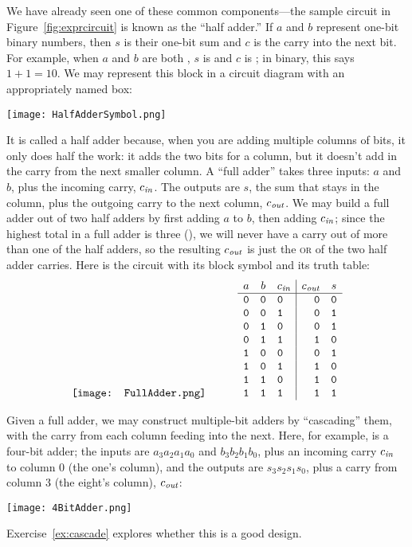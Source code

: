 We have already seen one of these common components---the sample circuit in Figure~\ref{fig:exprcircuit} is known as the ``half adder.'' If $a$ and $b$ represent one-bit binary numbers, then $s$ is their one-bit sum and $c$ is the carry into the next bit. For example, when $a$ and $b$ are both \1, $s$ is \0 and $c$ is \1; in binary, this says $1+1=10$. We may represent this block in a circuit diagram with an appropriately named box:
\begin{center}
\texttt{[image: HalfAdderSymbol.png]}
\end{center}
It is called a half adder because, when you are adding multiple columns of bits, it only does half the work: it adds the two bits for a column, but it doesn't add in the carry from the next smaller column. A ``full adder'' takes three inputs: $a$ and $b$, plus the incoming carry, $c_\textit{\scriptsize in}$. The outputs are $s$, the sum that stays in the column, plus the outgoing carry to the next column, $c_\textit{\scriptsize out}$. We may build a full adder out of two half adders by first adding $a$ to $b$, then adding $c_\textit{\scriptsize in}$; since the highest total in a full adder is three (\1\1), we will never have a carry out of more than one of the half adders, so the resulting $c_\textit{\scriptsize out}$ is just the \textsc{or} of the two half adder carries. Here is the circuit with its block symbol and its truth table:
\[
\texttt{[image: FullAdder.png]}\hspace{1cm}
\begin{array}[b]{ccl|rc}
a & b & c_\textit{\scriptsize in} & c_\textit{\scriptsize out} & s\\ \hline
\mathtt{0} & \mathtt{0} & \mathtt{0} & \mathtt{0} & \mathtt{0}\\
\mathtt{0} & \mathtt{0} & \mathtt{1} & \mathtt{0} & \mathtt{1}\\
\mathtt{0} & \mathtt{1} & \mathtt{0} & \mathtt{0} & \mathtt{1}\\
\mathtt{0} & \mathtt{1} & \mathtt{1} & \mathtt{1} & \mathtt{0}\\
\mathtt{1} & \mathtt{0} & \mathtt{0} & \mathtt{0} & \mathtt{1}\\
\mathtt{1} & \mathtt{0} & \mathtt{1} & \mathtt{1} & \mathtt{0}\\
\mathtt{1} & \mathtt{1} & \mathtt{0} & \mathtt{1} & \mathtt{0}\\
\mathtt{1} & \mathtt{1} & \mathtt{1} & \mathtt{1} & \mathtt{1}
\end{array}
\]

Given a full adder, we may construct multiple-bit adders by ``cascading'' them, with the carry from each column feeding into the next. Here, for example, is a four-bit adder; the inputs are $a_3a_2a_1a_0$ and $b_3b_2b_1b_0$, plus an incoming carry $c_\textit{\scriptsize in}$ to column 0 (the one's column), and the outputs are $s_3s_2s_1s_0$, plus a carry from column 3 (the eight's column), $c_\textit{\scriptsize out}$:
\begin{center}
\texttt{[image: 4BitAdder.png]}
\end{center}
Exercise~\ref{ex:cascade} explores whether this is a good design.

